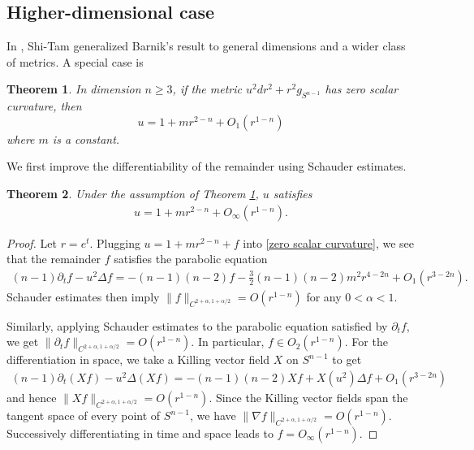 \documentclass[12pt,twoside]{article}
\theoremstyle{plain}
\newtheorem{theorem}{Theorem}[section]
\theoremstyle{definition}
\theoremstyle{remark}
\newcommand{\pl}{\partial}
\newcommand{\na}{\nabla}
\numberwithin{equation}{section}
\begin{document}
\subsection{Higher-dimensional case}
In \cite{ST}, Shi-Tam generalized Barnik's result to general dimensions and a wider class of metrics. A special case is  
\begin{theorem}\cite[Lemma 2.8]{ST}\label{ShiTam}
In dimension $n\ge 3$, if the metric $u^2 dr^2 + r^2 g_{S^{n-1}}$ has zero scalar curvature, then 
\[ u = 1 + mr^{2-n} + O_1(r^{1-n}) \]
where $m$ is a constant.
\end{theorem}

We first improve the differentiability of the remainder using Schauder estimates.
\begin{theorem}\label{ShiTam_improve}
Under the assumption of Theorem \ref{ShiTam}, $u$ satisfies
\begin{align*}
u = 1 + m r^{2-n} + O_\infty(r^{1-n}).
\end{align*}
\end{theorem}
\begin{proof}
Let $r = e^t$. Plugging $u = 1 + m r^{2-n} + f$ into \eqref{zero scalar curvature}, we see that the remainder $f$ satisfies the parabolic equation
\begin{align*}
(n-1) \pl_t f - u^2 \Delta f = -(n-1)(n-2)f -\frac{3}{2}(n-1)(n-2) m^2 r^{4-2n} + O_1(r^{3-2n}).
\end{align*}
Schauder estimates then imply $\| f \|_{C^{2+\alpha, 1+\alpha/2}} = O(r^{1-n})$ for any $0 <\alpha < 1$. 

Similarly, applying Schauder estimates to the parabolic equation satisfied by $\pl_t f$,  we get $\| \pl_t f\|_{C^{2+\alpha, 1 + \alpha/2}} = O(r^{1-n})$. In particular, $f \in O_2(r^{1-n})$. For the differentiation in space, we take a Killing vector field $X$ on $S^{n-1}$ to get
\begin{align*}
(n-1)\pl_t (Xf) - u^2 \Delta (Xf) = -(n-1)(n-2)Xf + X(u^2)\Delta f + O_1 (r^{3-2n})
\end{align*}
and hence $\| Xf\|_{C^{2+\alpha,1+\alpha/2}} = O(r^{1-n})$. Since the Killing vector fields span the tangent space of every point of $S^{n-1}$, we have $\| \na f\|_{C^{2+\alpha, 1 + \alpha/2}} = O(r^{1-n})$. Successively differentiating in time and space leads to $f = O_\infty(r^{1-n})$. 
\end{proof}
\end{document}
